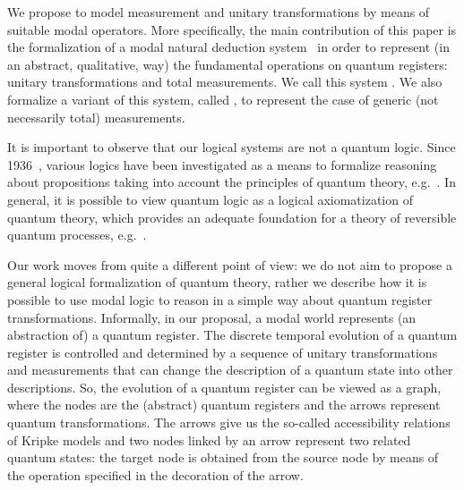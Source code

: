 \documentclass[times, 10pt]{article}
\begin{document}
We propose to model measurement and unitary transformations by means of suitable modal 
operators. More specifically, the main contribution of this paper is the formalization of 
a modal natural deduction system~\cite{Prawitz65,TroelstraSchwichtenberg96} 
in order to represent (in an abstract, qualitative, way) the fundamental operations on quantum registers: unitary transformations and total measurements. We call this system . We also formalize a variant of this system, called , to represent the case of generic (not necessarily total) measurements. 

It is important to observe that our logical systems are not a quantum
logic. Since 1936~\cite{vN36}, various logics have been investigated
as a means to formalize reasoning about propositions taking into account
the principles of quantum theory,
e.g.~\cite{DallaCh77,DallaChiara86}. In general, it is
possible to view quantum logic as a logical axiomatization of quantum
theory, which provides an adequate foundation for a theory of
reversible quantum processes,
e.g.~\cite{AbDu06,BaltSmets04,BalSmets06,Mittel79}.

Our work moves from quite a different point of view: we do not aim to propose a general logical formalization of quantum theory, rather we describe how it is possible to use modal logic to
reason in a simple way about quantum register transformations.  
Informally, in our proposal, a modal world represents (an abstraction of) a quantum register.
The discrete temporal evolution of a quantum register is controlled and determined by a 
sequence of unitary transformations and measurements that can change the description of a
quantum state into other descriptions. So, the evolution of a quantum register can be viewed as 
a graph, where the nodes are the (abstract) quantum registers and the arrows represent quantum transformations. The arrows give us the so-called accessibility relations of Kripke models and two
nodes linked by an arrow represent two related quantum states: the target node is obtained from
the source node by means of the operation specified in the decoration of the arrow.
\end{document}
